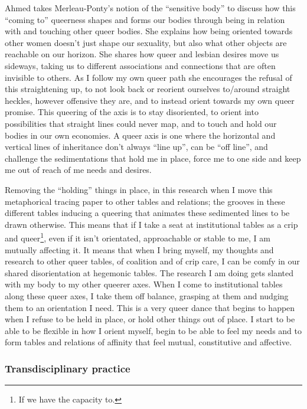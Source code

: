 Ahmed takes Merleau-Ponty's notion of the ``sensitive body'' to discuss
how this ``coming to'' queerness shapes and forms our bodies through
being in relation with and touching other queer bodies. She explains how
being oriented towards other women doesn't just shape our sexuality, but
also what other objects are reachable on our horizon. She shares how
queer and lesbian desires move us sideways, taking us to different
associations and connections that are often invisible to others. As I
follow my own queer path she encourages the refusal of this
straightening up, to not look back or reorient ourselves to/around
straight heckles, however offensive they are, and to instead orient
towards my own queer promise. This queering of the axis is to stay
disoriented, to orient into possibilities that straight lines could
never map, and to touch and hold our bodies in our own economies. A
queer axis is one where the horizontal and vertical lines of inheritance
don't always ``line up'', can be ``off line'', and challenge the
sedimentations that hold me in place, force me to one side and keep me
out of reach of me needs and desires.

Removing the ``holding'' things in place, in this research when I move
this metaphorical tracing paper to other tables and relations; the
grooves in these different tables inducing a queering that animates
these sedimented lines to be drawn otherwise. This means that if I take
a seat at institutional tables as a crip and queer\footnote{If we have
  the capacity to.}, even if it isn't orientated, approachable or stable
to me, I am mutually affecting it. It means that when I bring myself, my
thoughts and research to other queer tables, of coalition and of crip
care, I can be comfy in our shared disorientation at hegemonic tables.
The research I am doing gets slanted with my body to my other queerer
axes. When I come to institutional tables along these queer axes, I take
them off balance, grasping at them and nudging them to an orientation I
need. This is a very queer dance that begins to happen when I refuse to
be held in place, or hold other things out of place. I start to be able
to be flexible in how I orient myself, begin to be able to feel my needs
and to form tables and relations of affinity that feel mutual,
constitutive and affective.

\hypertarget{transdisciplinary-practice}{%
\subsubsection{Transdisciplinary
practice}\label{transdisciplinary-practice}}

